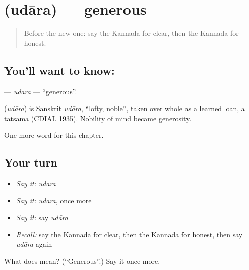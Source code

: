 \section[\texorpdfstring{\kn{ಉದಾರ} (udāra)}{ಉದಾರ (udāra)}]{ (udāra) — generous}

\label{lesson:KA-C218-udara}



\begin{quote}
Before the new one: say the Kannada for clear, then the Kannada for honest.
\end{quote}

\subsection*{You'll want to know: }
\textbf{} — \emph{udāra} — \textquotedblleft{}generous\textquotedblright{}.

\begin{cousinweb}
\textbf{} (\emph{udāra}) is Sanskrit \emph{udāra}, \textquotedblleft{}lofty, noble\textquotedblright{}, taken over whole as a learned loan, a tatsama (CDIAL 1935). Nobility of mind became generosity.
\end{cousinweb}

\begin{grammarlens}[title={What you've built}]
One more word for this chapter.
\end{grammarlens}

\subsection*{Your turn}
\begin{itemize}
\raggedright
  \item \emph{Say it:} \emph{udāra}
  \item \emph{Say it:} \emph{udāra}, once more
  \item \emph{Say it:} say \emph{udāra}
  \item \emph{Recall:} say the Kannada for clear, then the Kannada for honest, then say \emph{udāra} again
\end{itemize}

\begin{tcolorbox}[breakable,colback=teal!4,colframe=teal!35!black,title={Before you move on}]
What does  mean? (\textquotedblleft{}Generous\textquotedblright{}.) Say it once more.
\end{tcolorbox}

